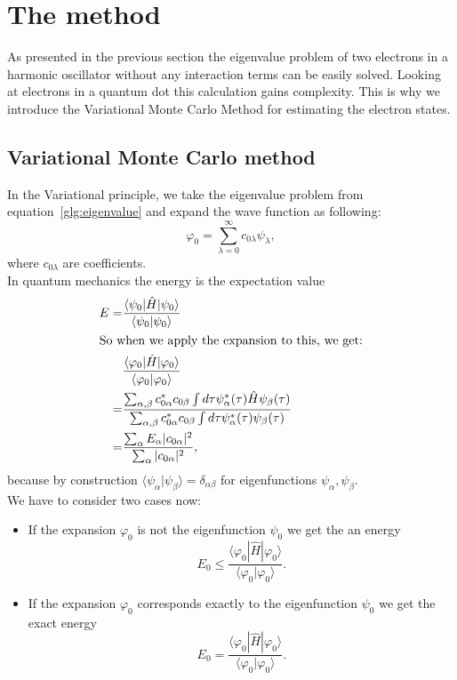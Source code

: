 \section{The method}\label{sec:algo}
As presented in the previous section the eigenvalue problem of two electrons in a harmonic oscillator without any interaction terms can be easily solved. Looking at electrons in a quantum dot this calculation gains complexity. This is why we introduce the Variational Monte Carlo Method for estimating the electron states.
\subsection{Variational Monte Carlo method}
In the Variational principle, we take the eigenvalue problem from equation~\ref{glg:eigenvalue} and expand the wave function as following:
\begin{equation}
\varphi_0 = \sum_{\lambda=0}^{\infty} c_{0 \lambda} \psi_{\lambda},
\end{equation}
where $c_{0 \lambda}$ are coefficients.\\
In quantum mechanics the energy is the expectation value
\begin{align}
E = &\frac{\langle \psi_0 | \hat{H} | \psi_0 \rangle}{\langle \psi_0 | \psi_0 \rangle}\\
\intertext{So when we apply the expansion to this, we get:}
&\frac{\langle \varphi_0 | \hat{H} | \varphi_0 \rangle}{\langle \varphi_0 | \varphi_0 \rangle}\\
= &\frac{\sum_{\alpha,\beta}c_{0\alpha}^*c_{0 \beta} \int d\tau \psi_{\alpha}^*(\tau)\hat{H}\psi_{\beta}(\tau)}{\sum_{\alpha,\beta}c_{0\alpha}^*c_{0 \beta} \int d\tau \psi_{\alpha}^*(\tau)\psi_{\beta}(\tau)}\\
= &\frac{\sum_{\alpha} E_{\alpha} |c_{0\alpha}|^2}{\sum_{\alpha} |c_{0\alpha}|^2},
\end{align}
because by construction $\langle\psi_{\alpha}| \psi_{\beta}\rangle = \delta_{\alpha \beta}$ for eigenfunctions $\psi_{\alpha},\psi_{\beta}$.\\
We have to consider two cases now:
\begin{itemize}
\item If the expansion $\varphi_0$ is not the eigenfunction $\psi_0$ we get the an energy
\begin{equation}
E_0 \leqslant \frac{\langle \varphi_0 | \hat{H} | \varphi_0 \rangle}{\langle \varphi_0 | \varphi_0 \rangle}.
\end{equation}
\item If the expansion $\varphi_0$ corresponds exactly to the eigenfunction $\psi_0$ we get the exact energy
\begin{equation}
E_0 = \frac{\langle \varphi_0 | \hat{H} | \varphi_0 \rangle}{\langle \varphi_0 | \varphi_0 \rangle}.
\end{equation}
\end{itemize}
